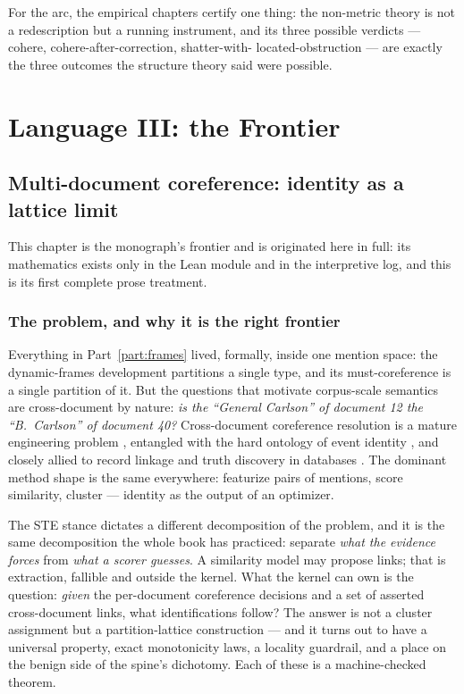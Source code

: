 \documentclass[10pt,twocolumn]{report}
\newcommand{\code}[1]{\texttt{\seqsplit{#1}}}
\renewcommand{\[}{\par\smallskip\noindent\begin{adjustbox}{max width=\columnwidth}$\displaystyle}%
\renewcommand{\]}{$\end{adjustbox}\par\smallskip}%
\newcommand{\Ste}[1]{\texttt{\seqsplit{Ste.#1}}}
\theoremstyle{definition}
\theoremstyle{remark}
\begin{document}
For the arc, the empirical chapters certify one thing: the non-metric
theory is not a redescription but a running instrument, and its three
possible verdicts --- cohere, cohere-after-correction, shatter-with-
located-obstruction --- are exactly the three outcomes the structure
theory said were possible.

\part{Language III: the Frontier}
\label{part:frontier}

\chapter{Multi-document coreference: identity as a lattice limit}
\label{ch:coref}

This chapter is the monograph's frontier and is originated here in
full: its mathematics exists only in the Lean module \Ste{Coreference}
and in the interpretive log, and this is its first complete prose
treatment.

\section{The problem, and why it is the right frontier}

Everything in Part~\ref{part:frames} lived, formally, inside one
mention space: the dynamic-frames development partitions a single
\code{Claim} type, and its must-coreference is a single partition of
it.  But the questions that motivate corpus-scale semantics are
cross-document by nature: \emph{is the ``General Carlson'' of document
12 the ``B.~Carlson'' of document 40?}  Cross-document coreference
resolution is a mature engineering problem
\citep{singh2011crossDocumentCoreference,barhom2021eventCoreference,
cattan2021sequentialCoreference}, entangled with the hard ontology of
event identity \citep{hovy2013events}, and closely allied to record
linkage and truth discovery in databases
\citep{elmagarmid2007duplicateRecordDetection,dong2009dataFusion,
li2015truthDiscoverySurvey,yin2007truthfinder}.  The dominant method
shape is the same everywhere: featurize pairs of mentions, score
similarity, cluster --- identity as the output of an optimizer.

The STE stance dictates a different decomposition of the problem, and
it is the same decomposition the whole book has practiced: separate
\emph{what the evidence forces} from \emph{what a scorer guesses}.  A
similarity model may propose links; that is extraction, fallible and
outside the kernel.  What the kernel can own is the question:
\emph{given} the per-document coreference decisions and a set of
asserted cross-document links, what identifications follow?  The answer
is not a cluster assignment but a partition-lattice construction ---
and it turns out to have a universal property, exact monotonicity laws,
a locality guardrail, and a place on the benign side of the spine's
dichotomy.  Each of these is a machine-checked theorem.
\end{document}
